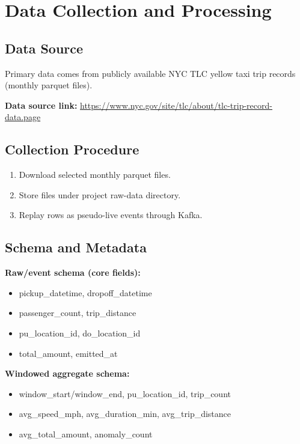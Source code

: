 \documentclass[11pt]{article}
\begin{document}
\section{Data Collection and Processing}
\subsection{Data Source}
Primary data comes from publicly available NYC TLC yellow taxi trip records (monthly parquet files).

\textbf{Data source link:} \url{https://www.nyc.gov/site/tlc/about/tlc-trip-record-data.page} \cite{tlc}

\subsection{Collection Procedure}
\begin{enumerate}[leftmargin=1.5em]
    \item Download selected monthly parquet files.
    \item Store files under project raw-data directory.
    \item Replay rows as pseudo-live events through Kafka.
\end{enumerate}

\subsection{Schema and Metadata}
\textbf{Raw/event schema (core fields):}
\begin{itemize}[leftmargin=1.5em]
    \item pickup\_datetime, dropoff\_datetime
    \item passenger\_count, trip\_distance
    \item pu\_location\_id, do\_location\_id
    \item total\_amount, emitted\_at
\end{itemize}

\textbf{Windowed aggregate schema:}
\begin{itemize}[leftmargin=1.5em]
    \item window\_start/window\_end, pu\_location\_id, trip\_count
    \item avg\_speed\_mph, avg\_duration\_min, avg\_trip\_distance
    \item avg\_total\_amount, anomaly\_count
\end{itemize}
\end{document}
